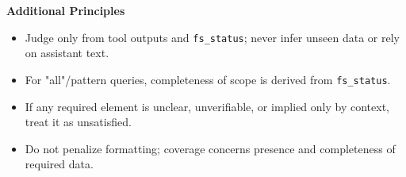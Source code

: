 \begin{ColorBlock}[Prompt]
\textbf{Additional Principles}
\begin{itemize}
  \item Judge only from tool outputs and \texttt{fs\_status}; never infer unseen data or rely on assistant text.
  \item For "all"/pattern queries, completeness of scope is derived from \texttt{fs\_status}.
  \item If any required element is unclear, unverifiable, or implied only by context, treat it as unsatisfied.
  \item Do not penalize formatting; coverage concerns presence and completeness of required data.
\end{itemize}
\end{ColorBlock}





